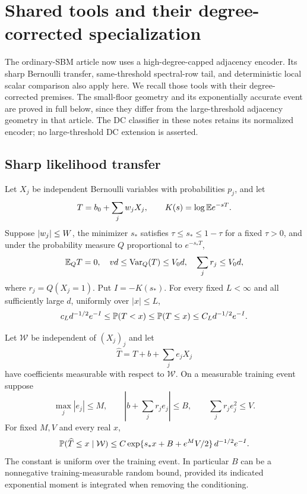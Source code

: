 \section{Shared tools and their degree-corrected specialization}\label{sec:sparse-extension}
The ordinary-SBM article now uses a high-degree-capped adjacency
encoder. Its sharp Bernoulli transfer, same-threshold spectral-row tail,
and deterministic local scalar comparison also apply here. We recall
those tools with their degree-corrected premises. The small-floor
geometry and its exponentially accurate event are proved in full below,
since they differ from the large-threshold adjacency geometry in that
article. The DC classifier in these notes retains its normalized
encoder; no large-threshold DC extension is asserted.

\subsection{Sharp likelihood transfer}\label{sec:sharp}
\begin{lemma}
\label{lem:sharp}
Let $X_j$ be independent Bernoulli variables with probabilities $p_j$,
and let
\[
 T=b_0+\sum_jw_jX_j,\qquad
 K(s)=\log\mathbb E e^{-sT}.
\]
Suppose $\left\lvert w_j\right\rvert\le W$, the minimizer $s_*$ satisfies
$\tau\le s_*\le1-\tau$ for a fixed $\tau>0$, and under the probability
measure $Q$ proportional to $e^{-s_*T}$,
\begin{equation}\label{eq:sharp-premises}
 \mathbb E_Q T=0,\quad vd\le\operatorname{Var}_Q(T)\le V_0d,
 \quad\sum_jr_j\le V_0d,
\end{equation}
where $r_j=Q(X_j=1)$. Put $I=-K(s_*)$.
For every fixed $L<\infty$ and all sufficiently large $d$, uniformly over
$|x|\le L$,
\begin{equation}\label{eq:sharp-oracle}
 c_Ld^{-1/2}e^{-I}\le\mathbb P(T<x)
 \le\mathbb P(T\le x)\le C_Ld^{-1/2}e^{-I}.
\end{equation}

Let $\mathcal W$ be independent of $(X_j)_j$ and let
\[
 \widehat T=T+b+\sum_je_jX_j
\]
have coefficients measurable with respect to $\mathcal W$. On a measurable
training event suppose
\begin{equation}\label{eq:tilt-error}
 \max_j|e_j|\le M,\qquad
 \left|b+\sum_jr_je_j\right|\le B,\qquad
 \sum_jr_je_j^2\le V.
\end{equation}
For fixed $M,V$ and every real $x$,
\begin{equation}\label{eq:sharp-transfer}
 \mathbb P(\widehat T\le x\mid\mathcal W)
 \le C\exp\{s_*x+B+e^M V/2\}\,d^{-1/2}e^{-I}.
\end{equation}
The constant is uniform over the training event. In particular $B$ can
be a nonnegative training-measurable random bound, provided its indicated
exponential moment is integrated when removing the conditioning.
\end{lemma}


